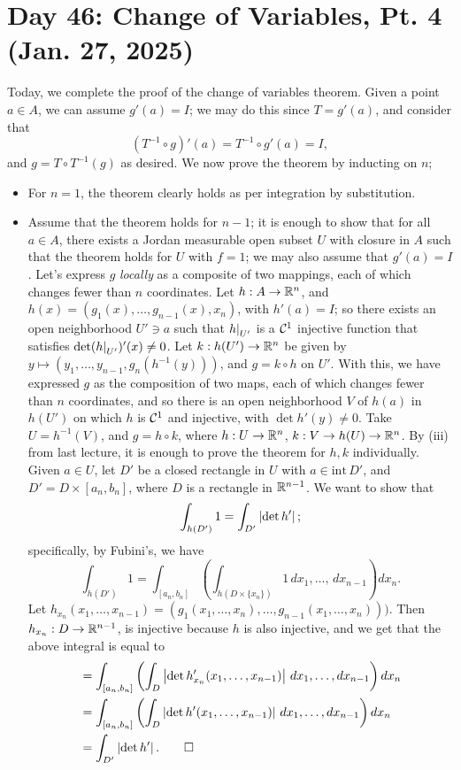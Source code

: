 \section{Day 46: Change of Variables, Pt. 4 (Jan. 27, 2025)}
Today, we complete the proof of the change of variables theorem. Given a point $a \in A$, we can assume $g'(a) = I$; we may do this since $T = g'(a)$, and consider that
\[ (T^{-1} \circ g)'(a) = T^{-1} \circ g'(a) = I, \]
and $g = T \circ T^{-1}(g)$ as desired. We now prove the theorem by inducting on $n$;
\begin{itemize}
    \item For $n = 1$, the theorem clearly holds as per integration by substitution.
    \item Assume that the theorem holds for $n-1$; it is enough to show that for all $a \in A$, there exists a Jordan measurable open subset $U$ with closure in $A$ such that the theorem holds for $U$ with $f = 1$; we may also assume that $g'(a) = I$. Let's express $g$ \textit{locally} as a composite of two mappings, each of which changes fewer than $n$ coordinates. Let $h : A \to \mathbb R^n$, and $h(x) = (g_1(x), \dots, g_{n-1}(x), x_n)$, with $h'(a) = I$; so there exists an open neighborhood $U' \ni a$ such that $\restr{h}{U'}$ is a $\mathcal C^1$ injective function that satisfies $\det(\restr{h}{U'})'(x) \neq 0$.
    \medskip\newline
    Let $k : h(U') \to \mathbb R^n$ be given by $y \mapsto (y_1, \dots, y_{n-1}, g_n(h^{-1}(y)))$, and $g = k \circ h$ on $U'$. With this, we have expressed $g$ as the composition of two maps, each of which changes fewer than $n$ coordinates, and so there is an open neighborhood $V$ of $h(a)$ in $h(U')$ on which $h$ is $\mathcal C^1$ and injective, with $\det h'(y) \neq 0$.
    \medskip\newline
    Take $U = h^{-1}(V)$, and $g = h \circ k$, where $h : U \to \mathbb R^n$, $k : V \to h(U) \to \mathbb R^n$. By (iii) from last lecture, it is enough to prove the theorem for $h, k$ individually. Given $a \in U$, let $D'$ be a closed rectangle in $U$ with $a \in \mathrm{int} \, D'$, and $D' = D \times [a_n, b_n]$, where $D$ is a rectangle in $\mathbb R^{n-1}$. We want to show that
    \[ \int_{h(D')} 1 = \int_{D'} \left\lvert \det h' \right\rvert; \]
    specifically, by Fubini's, we have
    \[ \int_{h(D')} 1 = \int_{[a_n, b_n]} \left( \int_{h(D \times \{x_n\})} 1 \, dx_1, \dots, \, dx_{n-1} \right) dx_n. \]
    Let $h_{x_n}(x_1, \dots, x_{n-1}) = (g_1(x_1, \dots, x_n), \dots, g_{n-1}(x_1, \dots, x_n)))$. Then $h_{x_n} : D \to \mathbb R^{n-1}$, is injective because $h$ is also injective, and we get that the above integral is equal to
    \begin{align*}
        &= \int_{[a_n, b_n]} \left( \int_D \left\lvert \det h_{x_n}' (x_1, \dots, x_{n-1}) \right\rvert \, dx_1, \dots, dx_{n-1} \right) dx_n \\
        &= \int_{[a_n, b_n]} \left( \int_D \left\lvert \det h' (x_1, \dots, x_{n-1}) \right\rvert \, dx_1, \dots, dx_{n-1} \right) dx_n \\
        &= \int_{D'} \left\lvert \det h' \right\rvert. \qed
    \end{align*}
\end{itemize}
